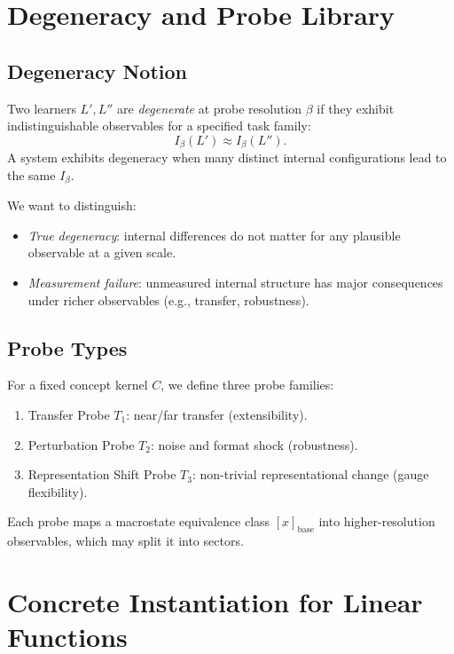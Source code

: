 \documentclass[11pt]{article}
\begin{document}
\section{Degeneracy and Probe Library}

\subsection{Degeneracy Notion}

\begin{definition}
Two learners $L', L''$ are \emph{degenerate} at probe resolution $\beta$ if they exhibit indistinguishable observables for a specified task family:
\[
I_\beta(L') \approx I_\beta(L'').
\]
A system exhibits degeneracy when many distinct internal configurations lead to the same $I_\beta$.
\end{definition}

We want to distinguish:
\begin{itemize}[itemsep=3pt]
  \item \emph{True degeneracy}: internal differences do not matter for any plausible observable at a given scale.
  \item \emph{Measurement failure}: unmeasured internal structure has major consequences under richer observables (e.g., transfer, robustness).
\end{itemize}

\subsection{Probe Types}

For a fixed concept kernel $C$, we define three probe families:
\begin{enumerate}[itemsep=3pt]
  \item Transfer Probe $T_1$: near/far transfer (extensibility).
  \item Perturbation Probe $T_2$: noise and format shock (robustness).
  \item Representation Shift Probe $T_3$: non-trivial representational change (gauge flexibility).
\end{enumerate}

Each probe maps a macrostate equivalence class $[x]_{\text{base}}$ into higher-resolution observables, which may split it into sectors.

\section{Concrete Instantiation for Linear Functions}
\end{document}
